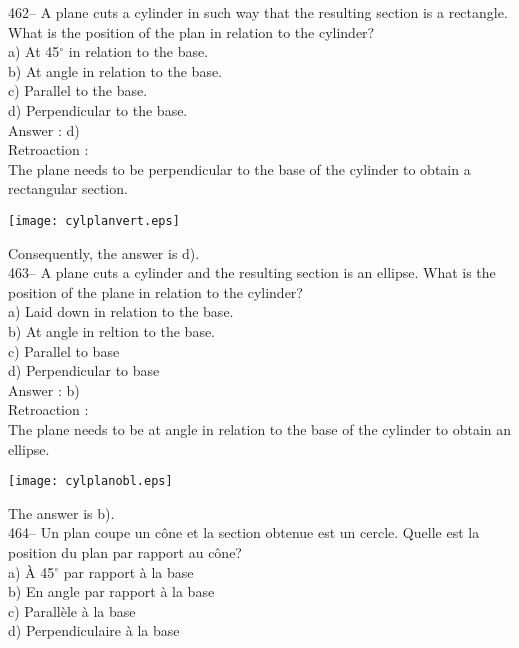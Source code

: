 ﻿\documentclass[letterpaper, 12pt]{article}
\begin{document}
462-- A plane cuts a cylinder in such way that the resulting section is a rectangle. What is the position of the plan in relation to the cylinder?\\
a) At 45$^{\circ}$ in relation to the base.\\
b) At angle in relation to the base.\\
c) Parallel to the base.\\
d) Perpendicular to the base.\\

Answer : d)\\

Retroaction : \\
The plane needs to be perpendicular to the base of the cylinder to obtain a rectangular section.
    \begin{center}
    \texttt{[image: cylplanvert.eps]}
    \end{center}

Consequently, the answer is d).\\

463-- A plane cuts a cylinder and the resulting section is an ellipse. What is the position of the plane in relation to the cylinder?\\
a) Laid down in relation to the base.\\
b) At angle in reltion to the base.\\
c) Parallel to base\\
d) Perpendicular to base\\

Answer : b)\\

Retroaction : \\
The plane needs to be at angle in relation to the base of the cylinder to obtain an ellipse.
    \begin{center}
    \texttt{[image: cylplanobl.eps]}
    \end{center}

The answer is b).\\


464-- Un plan coupe un c\^one et la section obtenue est un cercle.  Quelle
est la position du plan par rapport au c\^one?\\
a) \`A 45$^{\circ}$ par rapport \`a la base\\
b) En angle par rapport \`a la base\\
c) Parall\`ele \`a la base\\
d) Perpendiculaire \`a la base\\
\end{document}
